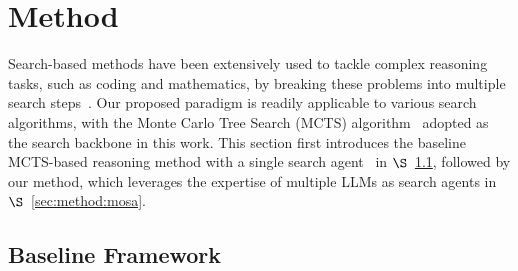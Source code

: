 



\section{Method}
\label{sec:method}

Search-based methods have been extensively used to tackle complex reasoning tasks, such as coding and mathematics, by breaking these problems into multiple search steps~\cite{zhou2023leasttomost,yao2024tree,hao-etal-2023-reasoning}.
Our proposed paradigm is readily applicable to various search algorithms, with the Monte Carlo Tree Search (MCTS) algorithm~\cite{mcts-1,mcts-2} adopted as the search backbone in this work.
This section first introduces the baseline MCTS-based reasoning method with a single search agent~\cite{hao-etal-2023-reasoning,qi2024mutual} in $\S$~\ref{sec:method:background}, followed by our method, which leverages the expertise of multiple LLMs as search agents in $\S$~\ref{sec:method:mosa}.



\subsection{Baseline Framework}
\label{sec:method:background}


